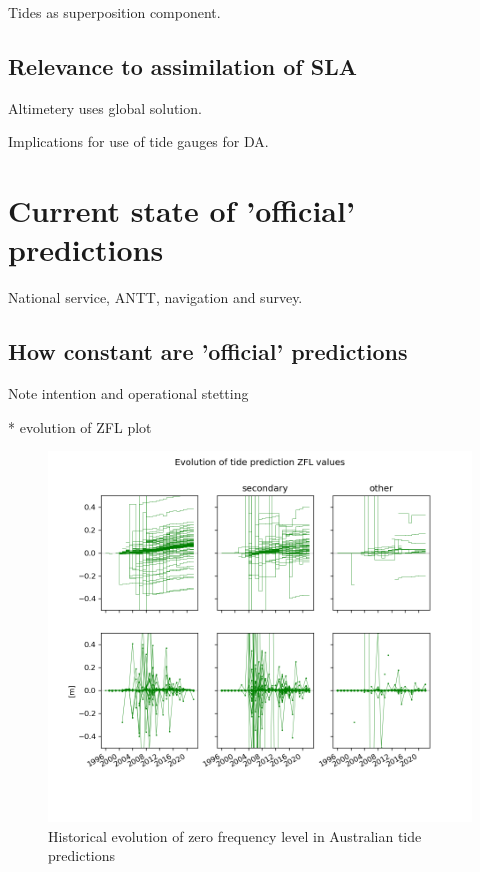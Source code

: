 Tides as superposition component.

\subsection{Relevance to assimilation of SLA}
Altimetery uses global solution.

Implications for use of tide gauges for DA.


\section{Current state of 'official' predictions}

National service, ANTT, navigation and survey.

\subsection{How constant are 'official' predictions}

Note intention and operational stetting

* evolution of ZFL
plot


\begin{figure}[h]\centering
  \includegraphics[width=150mm]{figures/plots/tidal_z0_evolution.png}
  \caption{Historical evolution of zero frequency level in Australian tide predictions}
  \label{fig:tbc}
\end{figure}

